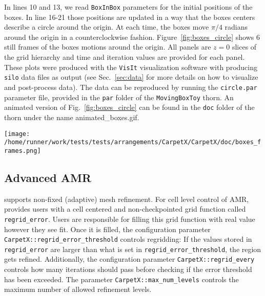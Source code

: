 In lines 10 and 13, we read \texttt{BoxInBox} parameters for the initial positions of the boxes. In line 16-21 those positions are updated in a way that the boxes centers describe a circle around the origin. At each time, the boxes move $\pi/4$ radians around the origin in a counterclockwise fashion. Figure~\ref{fig:boxes_circle} shows 6 still frames of the boxes motions around the origin. All panels are $z=0$ slices of the grid hierarchy and time and iteration values are provided for each panel. These plots were produced with the \texttt{VisIt} visualization software with \CarpetX\space producing \texttt{silo} data files as output (see Sec.~\ref{sec:data} for more details on how to visualize and post-process \CarpetX\space data). The data can be reproduced by running the \texttt{circle.par} parameter file, provided in the \texttt{par} folder of the \texttt{MovingBoxToy} thorn. An animated version of Fig.~\ref{fig:boxes_circle} can be found in the \texttt{doc} folder of the \CarpetX\space thorn under the name {animated\_boxes.gif}.

\begin{figure*}[ht]
  \begin{center}
      \texttt{[image: /home/runner/work/tests/tests/arrangements/CarpetX/CarpetX/doc/boxes\_frames.png]}
  \end{center}
  \caption{AMR boxes moving around a circle, as implemented in the \texttt{MovingBoxToy} thorn.}
  \label{fig:boxes_circle}
\end{figure*}

\subsection{Advanced AMR}
\label{sec:advanced_amr}

\CarpetX\space supports non-fixed (adaptive) mesh refinement. For cell level control of AMR, \CarpetXRegridError\space provides users with a cell centered and non-checkpointed grid function called \texttt{regrid\_error}. Users are responsible for filling this grid function with real value however they see fit. Once it is filled, the configuration parameter \texttt{CarpetX::regrid\_error\_threshold} controls regridding: If the values stored in \texttt{regrid\_error} are larger than what is set in \texttt{regrid\_error\_threshold}, the region gets refined. Additionally, the configuration parameter \texttt{CarpetX::regrid\_every} controls how many iterations should pass before checking if the error threshold has been exceeded. The parameter \texttt{CarpetX::max\_num\_levels} controls the maximum number of allowed refinement levels.

